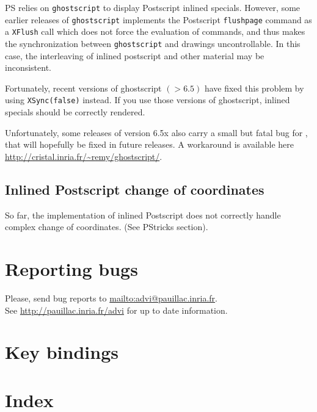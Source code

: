 \documentclass[12pt]{article}
\begin{document}
PS relies on {\tt ghostscript} to display Postscript inlined specials.
However, some earlier releases of {\tt ghostscript} 
implements the Postscript {\tt flushpage} command as a {\tt XFlush} call
which does not force the evaluation of commands, and thus makes the 
synchronization between {\tt ghostscript} and {\ActiveDVI} drawings
uncontrollable. In this case, the interleaving of inlined postscript 
and other material may be inconsistent. 

Fortunately, recent versions of ghostscript $(> 6.5)$ have
fixed this problem by using {\tt XSync(false)} instead.
If you use those versions of ghostscript, inlined specials should be
correctly rendered.

Unfortunately, some releases of version 6.5x also carry a small but
fatal bug for \ActiveDVI, that will hopefully be fixed in future
releases. A workaround is available here
\url{http://cristal.inria.fr/~remy/ghostscript/}.

\subsection*{Inlined Postscript change of coordinates}

So far, the implementation of inlined Postscript does not correctly handle
complex change of coordinates.  (See PStricks section). 

\section{Reporting bugs}

Please, send bug reports to 
\url{mailto:advi@pauillac.inria.fr}. 
\\
See \url{http://pauillac.inria.fr/advi} for up to date information.


\section{Key bindings}

\def\key#1{\textcolor{red}{#1}}
\def\ikey#1#2#3{\key{#1} & #2 & -- & #3\\}
\def\arg{\textcolor{blue}{arg }}

\let \Newpage \newpage

\def \newpage {}



\def \newpage{\Newpage}

\section{Index}

\printindex
\end{document}
